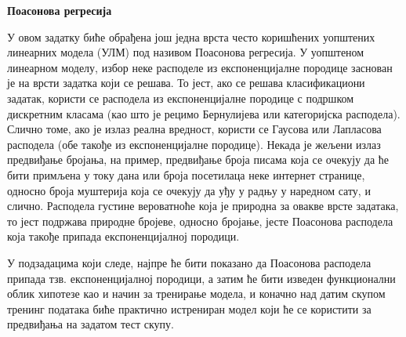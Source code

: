 \item {} {\bf Поасонова регресија}

У овом задатку биће обрађена још једна врста често коришћених уопштених линеарних модела (УЛМ) под називом Поасонова регресија. У уопштеном линеарном моделу, избор неке расподеле из експоненцијалне породице заснован је на врсти задатка који се решава. То јест, ако се решава класификациони задатак, користи се расподела из експоненцијалне породице с подршком дискретним класама (као што је рецимо Бернулијева или категоријска расподела). Слично томе, ако је излаз реална вредност, користи се Гаусова или Лапласова расподела (обе такође из експоненцијалне породице). Некада је жељени излаз предвиђање бројања, на пример, предвиђање броја писама која се очекују да ће бити примљена у току дана или броја посетилаца неке интернет странице, односно броја муштерија која се очекују да уђу у радњу у наредном сату, и слично. Расподела густине вероватноће која је природна за овакве врсте задатака, то јест подржава природне бројеве, односно бројање, јесте Поасонова расподела која такође припада експоненцијалној породици.

У подзадацима који следе, најпре ће бити показано да Поасонова расподела припада тзв. експоненцијалној породици, а затим ће бити изведен функционални облик хипотезе као и начин за тренирање модела, и коначно над датим скупом тренинг података биће практично истрениран модел који ће се користити за предвиђања на задатом тест скупу.

\begin{enumerate}
	

\ifnum{}\fi

	


\ifnum{}\fi

	


\ifnum{}\fi

	


\ifnum{} {
  
} \fi

\end{enumerate}
